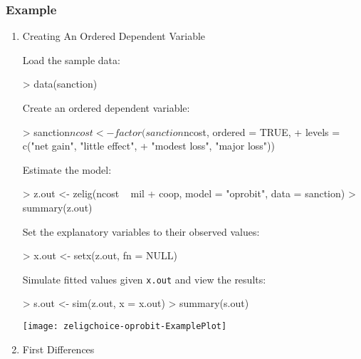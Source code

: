 \documentclass{article}
\begin{document}
\subsubsection{Example}
\begin{enumerate}
\item {Creating An Ordered Dependent Variable} \label{ord.fact.p}

Load the sample data:  
\begin{Schunk}
\begin{Sinput}
>  data(sanction)
\end{Sinput}
\end{Schunk}
Create an ordered dependent variable: 
\begin{Schunk}
\begin{Sinput}
>  sanction$ncost <- factor(sanction$ncost, ordered = TRUE,
+                            levels = c("net gain", "little effect", 
+                            "modest loss", "major loss"))
\end{Sinput}
\end{Schunk}
Estimate the model:
\begin{Schunk}
\begin{Sinput}
>  z.out <- zelig(ncost ~ mil + coop, model = "oprobit", data = sanction)
>  summary(z.out)
\end{Sinput}
\end{Schunk}
Set the explanatory variables to their observed values:  
\begin{Schunk}
\begin{Sinput}
>  x.out <- setx(z.out, fn = NULL)
\end{Sinput}
\end{Schunk}
Simulate fitted values given {\tt x.out} and view the results:
\begin{Schunk}
\begin{Sinput}
>  s.out <- sim(z.out, x = x.out)
>  summary(s.out)
\end{Sinput}
\end{Schunk}
\begin{center}
\texttt{[image: zeligchoice-oprobit-ExamplePlot]}
\end{center}

\item {First Differences}


\end{enumerate}
\end{document}
